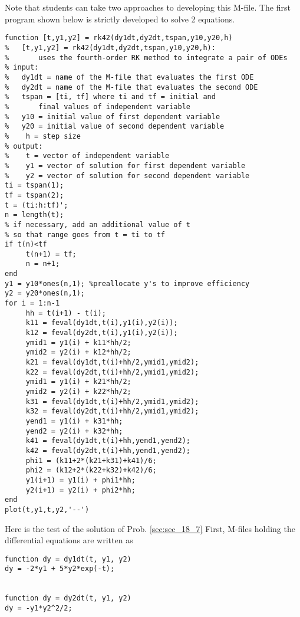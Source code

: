 \documentclass[../main.tex]{subfiles}
\begin{document}
\section{}
\begin{blockquote}
 Note that students can take two approaches to developing this M-file. The first program
shown below is strictly developed to solve 2 equations. 
\end{blockquote}
	\bigbreak
\begin{lstlisting}[numbers=none]
function [t,y1,y2] = rk42(dy1dt,dy2dt,tspan,y10,y20,h)
% 	[t,y1,y2] = rk42(dy1dt,dy2dt,tspan,y10,y20,h):
% 		uses the fourth-order RK method to integrate a pair of ODEs
% input:
% 	dy1dt = name of the M-file that evaluates the first ODE
% 	dy2dt = name of the M-file that evaluates the second ODE
% 	tspan = [ti, tf] where ti and tf = initial and
% 		final values of independent variable
% 	y10 = initial value of first dependent variable
% 	y20 = initial value of second dependent variable
%	 h = step size
% output:
%	 t = vector of independent variable
%	 y1 = vector of solution for first dependent variable
%	 y2 = vector of solution for second dependent variable
ti = tspan(1);
tf = tspan(2);
t = (ti:h:tf)';
n = length(t);
% if necessary, add an additional value of t
% so that range goes from t = ti to tf
if t(n)<tf
	 t(n+1) = tf;
	 n = n+1;
end
y1 = y10*ones(n,1); %preallocate y's to improve efficiency
y2 = y20*ones(n,1);
for i = 1:n-1
	 hh = t(i+1) - t(i);
	 k11 = feval(dy1dt,t(i),y1(i),y2(i));
	 k12 = feval(dy2dt,t(i),y1(i),y2(i));
	 ymid1 = y1(i) + k11*hh/2;
	 ymid2 = y2(i) + k12*hh/2;
	 k21 = feval(dy1dt,t(i)+hh/2,ymid1,ymid2);
	 k22 = feval(dy2dt,t(i)+hh/2,ymid1,ymid2);
	 ymid1 = y1(i) + k21*hh/2;
	 ymid2 = y2(i) + k22*hh/2;
	 k31 = feval(dy1dt,t(i)+hh/2,ymid1,ymid2);
	 k32 = feval(dy2dt,t(i)+hh/2,ymid1,ymid2);
	 yend1 = y1(i) + k31*hh;
	 yend2 = y2(i) + k32*hh;
	 k41 = feval(dy1dt,t(i)+hh,yend1,yend2);
	 k42 = feval(dy2dt,t(i)+hh,yend1,yend2);
	 phi1 = (k11+2*(k21+k31)+k41)/6;
	 phi2 = (k12+2*(k22+k32)+k42)/6;
	 y1(i+1) = y1(i) + phi1*hh;
	 y2(i+1) = y2(i) + phi2*hh;
end
plot(t,y1,t,y2,'--')
\end{lstlisting}
	\bigbreak
Here is the test of the solution of Prob. \ref{sec:sec_18_7} First, M-files holding the differential equations
are written as
	\bigbreak
\begin{lstlisting}[numbers=none]
function dy = dy1dt(t, y1, y2)
dy = -2*y1 + 5*y2*exp(-t);


function dy = dy2dt(t, y1, y2)
dy = -y1*y2^2/2; 
\end{lstlisting}
\end{document}
